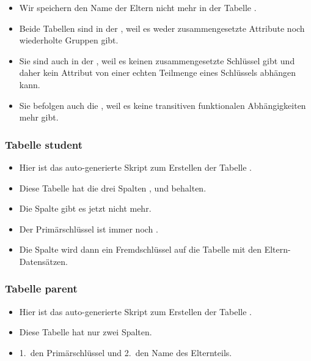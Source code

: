\documentclass[aspectratio=169,mathserif,notheorems]{beamer}%
\begin{document}
\begin{frame}[t]
\begin{itemize}
{}%
%
\item<16-> Wir speichern den Name der Eltern nicht mehr in der Tabelle .%
%
\item<18-> Beide Tabellen sind in der , weil es weder zusammengesetzte Attribute noch wiederholte Gruppen gibt.%
%
\item<19-> Sie sind auch in der , weil es keinen zusammengesetzte Schlüssel gibt und daher kein Attribut von einer echten Teilmenge eines Schlüssels abhängen kann.%
%
\item<20-> Sie befolgen auch die , weil es keine transitiven funktionalen Abhängigkeiten mehr gibt.%
%
\end{itemize}%
%
%
%
\end{frame}%
%
%
\begin{frame}[t]%
\frametitle{Tabelle student}%
\parbox{0.435\linewidth}{\small%
\begin{itemize}%
%
\item Hier ist das auto-generierte Skript zum Erstellen der Tabelle .%
%
\item<2-> Diese Tabelle hat die drei Spalten ,  und  behalten.%
%
\item<3-> Die Spalte  gibt es jetzt nicht mehr.%
%
\item<4-> Der Primärschlüssel ist immer noch .%
%
\item<5-> Die Spalte  wird dann ein Fremdschlüssel auf die Tabelle mit den Eltern-Datensätzen.%
%
\end{itemize}%
}%
%
%
%
%
\end{frame}%
%
%
\begin{frame}[t]%
\frametitle{Tabelle parent}%
\parbox{0.435\linewidth}{\small%
\begin{itemize}%
%
\item Hier ist das auto-generierte Skript zum Erstellen der Tabelle .%
%
\item<2-> Diese Tabelle hat nur zwei Spalten.%
%
\item<3-> 1.~den Primärschlüssel  und 2.~den Name des Elternteils.%
\end{itemize}%
}%
%
%
%
\end{frame}%
\end{document}
